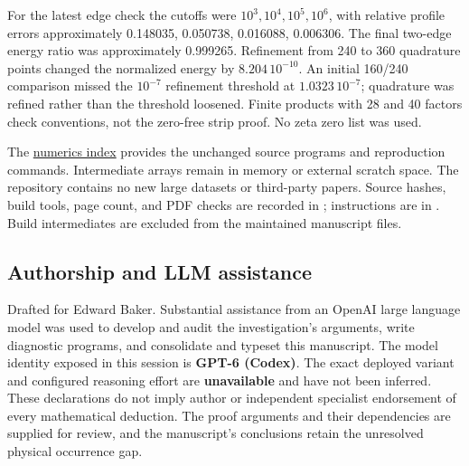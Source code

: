 For the latest edge check the cutoffs were
$10^3,10^4,10^5,10^6$, with relative profile errors
approximately 0.148035, 0.050738, 0.016088, 0.006306.
The final two-edge energy ratio was approximately
0.999265. Refinement from 240 to 360 quadrature points
changed the normalized energy by $8.204\,10^{-10}$.
An initial 160/240 comparison missed the $10^{-7}$
refinement threshold at $1.0323\,10^{-7}$; quadrature
was refined rather than the threshold loosened.
Finite products with 28 and 40 factors check
conventions, not the zero-free strip proof.
No zeta zero list was used.

The \href{numerics/README.md}{numerics index} provides
the unchanged source programs and reproduction commands.
Intermediate arrays remain in memory or external
scratch space. The repository contains no new large
datasets or third-party papers. Source hashes, build
tools, page count, and PDF checks are recorded in
; instructions are in
. Build intermediates are excluded
from the maintained manuscript files.

\subsection{Authorship and LLM assistance}
Drafted for Edward Baker. Substantial assistance from
an OpenAI large language model was used to develop
and audit the investigation's arguments, write
diagnostic programs, and consolidate and typeset this
manuscript. The model identity exposed in this session
is \textbf{GPT-6 (Codex)}. The exact deployed variant
and configured reasoning effort are \textbf{unavailable}
and have not been inferred. These declarations do
not imply author or independent specialist endorsement
of every mathematical deduction. The proof arguments
and their dependencies are supplied for review, and
the manuscript's conclusions retain the unresolved
physical occurrence gap.
